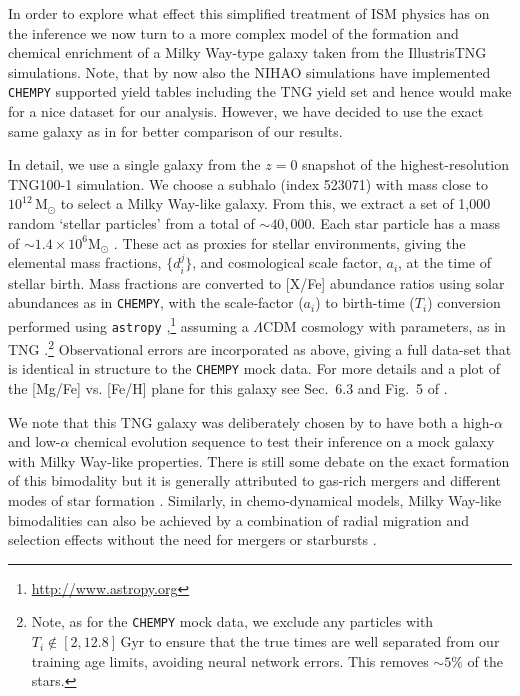 \documentclass{aa}
\begin{document}
In order to explore what effect this simplified treatment of ISM physics has on the inference we now turn to a more complex model of the formation and chemical enrichment of a Milky Way-type galaxy taken from the IllustrisTNG simulations. Note, that by now also the NIHAO simulations \citep{Wang2015, Buck2020,Buck2020c} have implemented \texttt{CHEMPY} supported yield tables including the TNG yield set \citep{Buck2021} and hence would make for a nice dataset for our analysis. However, we have decided to use the exact same galaxy as in \citet{Philcox_2019} for better comparison of our results.

In detail, we use a single galaxy from the $z = 0$ snapshot of the highest-resolution TNG100-1 simulation. We choose a subhalo (index 523071) with mass close to $10^{12}\,\mathrm{M}_\odot$ to select a Milky Way-like galaxy. From this, we extract a set of 1,000 random `stellar particles' from a total of $\sim 40,000$. Each star particle has a mass of $\sim 1.4\times 10^6 \mathrm{M}_\odot$ \citep{2019ComAC...6....2N}. These act as proxies for stellar environments, giving the elemental mass fractions, $\{d_i^j\}$, and cosmological scale factor, $a_i$, at the time of stellar birth. Mass fractions are converted to [X/Fe] abundance ratios using \citet{2009ARA&A..47..481A} solar abundances as in \texttt{CHEMPY}, with the scale-factor ($a_i$) to birth-time ($T_i$) conversion performed using \texttt{astropy} \citep{astropy:2013,astropy:2018},\footnote{\href{http://www.astropy.org}{http://www.astropy.org}} assuming a $\Lambda$CDM cosmology with \citet{planck2015} parameters, as in TNG \citep{2018MNRAS.475..648P}.\footnote{Note, as for the \texttt{CHEMPY} mock data, we exclude any particles with $T_i\notin[2,12.8]\,\mathrm{Gyr}$ to ensure that the true times are well separated from our training age limits, avoiding neural network errors. This removes $\sim5\%$ of the stars.} Observational errors are incorporated as above, giving a full data-set that is identical in structure to the \texttt{CHEMPY} mock data. For more details and a plot of the [Mg/Fe] vs. [Fe/H] plane for this galaxy see Sec.~6.3 and Fig.~5 of \citet{Philcox_2019}.

We note that this TNG galaxy was deliberately chosen by \citet{Philcox_2019} to have both a high-$\alpha$ and low-$\alpha$ chemical evolution sequence to test their inference on a mock galaxy with Milky Way-like properties. There is still some debate on the exact formation of this bimodality but it is generally attributed to gas-rich mergers and different modes of star formation \citep[e.g.][]{2018MNRAS.474.3629G,2018MNRAS.477.5072M,2019MNRAS.484.3476C,Buck2020,Buck2023}. Similarly, in chemo-dynamical models, Milky Way-like bimodalities can also be achieved by a combination of radial migration and selection effects without the need for mergers or starbursts \citep[e.g.][]{2009MNRAS.396..203S,2013A&A...558A...9M,2017ApJ...835..224A}.
\end{document}
